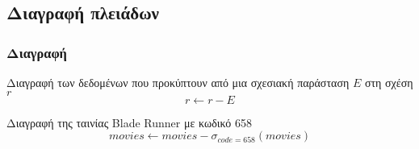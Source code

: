 \subsection[{\en Delete}]{\textgreek{Διαγραφή πλειάδων}}

\begin{frame}
\frametitle{Διαγραφή}
\begin{minipage}{\wE}
  \begin{block}{Διαγραφή των δεδομένων που προκύπτουν από μια σχεσιακή παράσταση $E$ στη σχέση $r$}
  \[
    r \leftarrow r - E
  \]
  \end{block}
  \begin{exampleblock}{Διαγραφή της ταινίας {\en Blade Runner} με κωδικό 658}
  \en
  \[
    movies \leftarrow movies - \sigma_{code=658}(movies)
  \]
  \end{exampleblock}
\end{minipage}
\end{frame}





